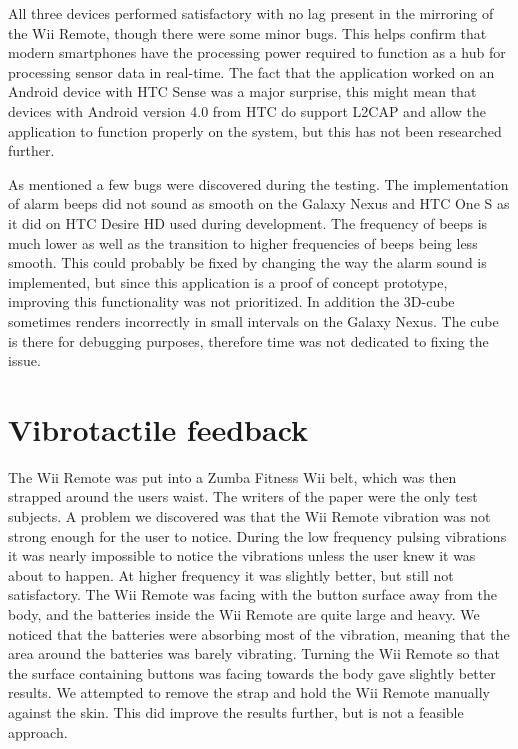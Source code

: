 All three devices performed satisfactory with no lag present in the mirroring of the Wii Remote, though there were some minor bugs. This helps confirm that modern smartphones have the processing power required to function as a hub for processing sensor data in real-time. The fact that the application worked on an Android device with HTC Sense was a major surprise, this might mean that devices with Android version 4.0 from HTC do support L2CAP and allow the application to function properly on the system, but this has not been researched further.

As mentioned a few bugs were discovered during the testing. The implementation of alarm beeps did not sound as smooth on the Galaxy Nexus and HTC One S as it did on HTC Desire HD used during development. The frequency of beeps is much lower as well as the transition to higher frequencies of beeps being less smooth. This could probably be fixed by changing the way the alarm sound is implemented, but since this application is a proof of concept prototype, improving this functionality was not prioritized. In addition the 3D-cube sometimes renders incorrectly in small intervals on the Galaxy Nexus. The cube is there  for debugging purposes, therefore time was not dedicated to fixing the issue.

\section{Vibrotactile feedback}
The Wii Remote was put into a Zumba Fitness Wii belt, which was then strapped around the users waist. The writers of the paper were the only test subjects. A problem we discovered was that the Wii Remote vibration was not strong enough for the user to notice. During the low frequency pulsing vibrations it was nearly impossible to notice the vibrations unless the user knew it was about to happen. At higher frequency it was slightly better, but still not satisfactory. The Wii Remote was facing with the button surface away from the body, and the batteries inside the Wii Remote are quite large and heavy. We noticed that the batteries were absorbing most of the vibration, meaning that the area around the batteries was barely vibrating. Turning the Wii Remote so that the surface containing buttons was facing towards the body gave slightly better results. We attempted to remove the strap and hold the Wii Remote manually against the skin. This did improve the results further, but is not a feasible approach.
